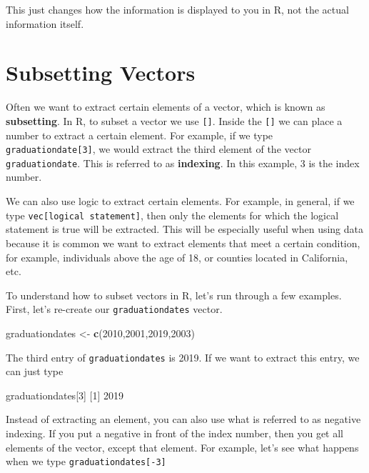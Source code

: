 \documentclass[
]{book}
\newenvironment{Shaded}{\begin{snugshade}}{\end{snugshade}}
\newcommand{\DecValTok}[1]{\textcolor[rgb]{0.00,0.00,0.81}{#1}}
\newcommand{\FunctionTok}[1]{\textcolor[rgb]{0.13,0.29,0.53}{\textbf{#1}}}
\newcommand{\NormalTok}[1]{#1}
\newcommand{\OtherTok}[1]{\textcolor[rgb]{0.56,0.35,0.01}{#1}}
\begin{document}
This just changes how the information is displayed to you in R, not the actual information itself.

\section{Subsetting Vectors}\label{subsetting-vectors}

Often we want to extract certain elements of a vector, which is known as \textbf{subsetting}. In R, to subset a vector we use \texttt{{[}{]}}. Inside the \texttt{{[}{]}} we can place a number to extract a certain element. For example, if we type \texttt{graduationdate{[}3{]}}, we would extract the third element of the vector \texttt{graduationdate}. This is referred to as \textbf{indexing}. In this example, 3 is the index number.

We can also use logic to extract certain elements. For example, in general, if we type \texttt{vec{[}logical\ statement{]}}, then only the elements for which the logical statement is true will be extracted. This will be especially useful when using data because it is common we want to extract elements that meet a certain condition, for example, individuals above the age of 18, or counties located in California, etc.

To understand how to subset vectors in R, let's run through a few examples. First, let's re-create our \texttt{graduationdates} vector.

\begin{Shaded}
\begin{Highlighting}[]
\NormalTok{graduationdates }\OtherTok{\textless{}{-}} \FunctionTok{c}\NormalTok{(}\DecValTok{2010}\NormalTok{,}\DecValTok{2001}\NormalTok{,}\DecValTok{2019}\NormalTok{,}\DecValTok{2003}\NormalTok{)}
\end{Highlighting}
\end{Shaded}

The third entry of \texttt{graduationdates} is 2019. If we want to extract this entry, we can just type

\begin{Shaded}
\begin{Highlighting}[]
\NormalTok{graduationdates[}\DecValTok{3}\NormalTok{]}
\NormalTok{[}\DecValTok{1}\NormalTok{] }\DecValTok{2019}
\end{Highlighting}
\end{Shaded}

Instead of extracting an element, you can also use what is referred to as negative indexing. If you put a negative in front of the index number, then you get all elements of the vector, except that element. For example, let's see what happens when we type \texttt{graduationdates{[}-3{]}}
\end{document}
